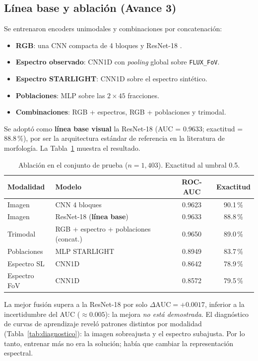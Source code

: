 \subsection{Línea base y ablación (Avance 3)}
Se entrenaron encoders unimodales y combinaciones por concatenación:
\begin{itemize}
  \item \textbf{RGB}: una CNN compacta de 4 bloques y ResNet-18 \citep{he2016}.
  \item \textbf{Espectro observado}: CNN1D con \emph{pooling} global sobre \texttt{FLUX\_FoV}.
  \item \textbf{Espectro STARLIGHT}: CNN1D sobre el espectro sintético.
  \item \textbf{Poblaciones}: MLP sobre las $2\times45$ fracciones.
  \item \textbf{Combinaciones}: RGB + espectros, RGB + poblaciones y trimodal.
\end{itemize}
Se adoptó como \textbf{línea base visual} la ResNet-18 (AUC = 0.9633; exactitud = 88.8\,\%), por ser la arquitectura estándar de referencia en la literatura de morfología. La Tabla~\ref{tab:ablacion} muestra el resultado.

\begin{table}[htbp]
\centering
\caption{Ablación en el conjunto de prueba ($n=1{,}403$). Exactitud al umbral 0.5.}
\label{tab:ablacion}
\small
\begin{tabular}{llcc}
\toprule
\textbf{Modalidad} & \textbf{Modelo} & \textbf{ROC-AUC} & \textbf{Exactitud}\\
\midrule
Imagen & CNN 4 bloques & 0.9623 & 90.1\,\%\\
Imagen & ResNet-18 (\textbf{línea base}) & 0.9633 & 88.8\,\%\\
Trimodal & RGB + espectro + poblaciones (concat.) & 0.9650 & 89.0\,\%\\
Poblaciones & MLP STARLIGHT & 0.8949 & 83.7\,\%\\
Espectro SL & CNN1D & 0.8642 & 78.9\,\%\\
Espectro FoV & CNN1D & 0.8572 & 79.5\,\%\\
\bottomrule
\end{tabular}
\end{table}

La mejor fusión supera a la ResNet-18 por solo $\Delta\text{AUC}=+0.0017$, inferior a la incertidumbre del AUC ($\approx 0.005$): la mejora \emph{no está demostrada}. El diagnóstico de curvas de aprendizaje reveló patrones distintos por modalidad (Tabla~\ref{tab:diagnostico}): la imagen sobreajusta y el espectro subajusta. Por lo tanto, entrenar más no era la solución; había que cambiar la representación espectral.

